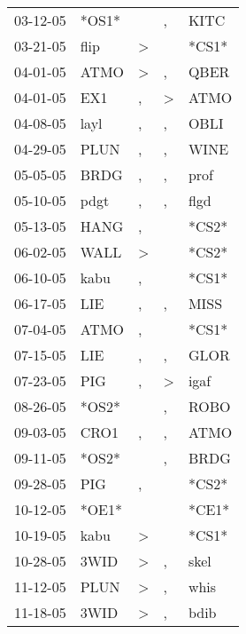 \begin{supertabular}{lllll}
 03-12-05 &  *OS1* &                  &                , &   KITC \\
 03-21-05 &   flip &     \textgreater &                  &  *CS1* \\
 04-01-05 &   ATMO &     \textgreater &                , &   QBER \\
 04-01-05 &    EX1 &                , &     \textgreater &   ATMO \\
 04-08-05 &   layl &                , &                , &   OBLI \\
 04-29-05 &   PLUN &                , &                , &   WINE \\
 05-05-05 &   BRDG &                , &                , &   prof \\
 05-10-05 &   pdgt &                , &                , &   flgd \\
 05-13-05 &   HANG &                , &                  &  *CS2* \\
 06-02-05 &   WALL &     \textgreater &                  &  *CS2* \\
 06-10-05 &   kabu &                , &                  &  *CS1* \\
 06-17-05 &    LIE &                , &                , &   MISS \\
 07-04-05 &   ATMO &                , &                  &  *CS1* \\
 07-15-05 &    LIE &                , &                , &   GLOR \\
 07-23-05 &    PIG &                , &     \textgreater &   igaf \\
 08-26-05 &  *OS2* &                  &                , &   ROBO \\
 09-03-05 &   CRO1 &                , &                , &   ATMO \\
 09-11-05 &  *OS2* &                  &                , &   BRDG \\
 09-28-05 &    PIG &                , &                  &  *CS2* \\
 10-12-05 &  *OE1* &                  &                  &  *CE1* \\
 10-19-05 &   kabu &     \textgreater &                  &  *CS1* \\
 10-28-05 &   3WID &     \textgreater &                , &   skel \\
 11-12-05 &   PLUN &     \textgreater &                , &   whis \\
 11-18-05 &   3WID &     \textgreater &                , &   bdib \\

\end{supertabular}
